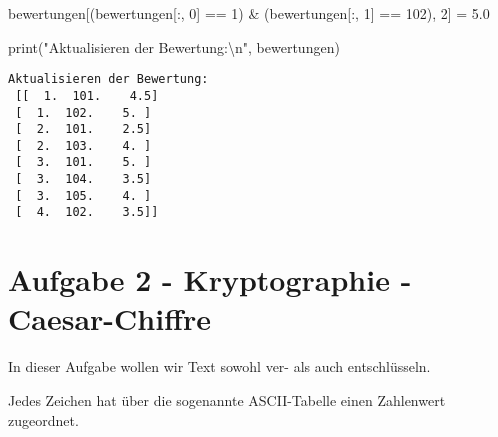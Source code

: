\documentclass[
  letterpaper,
  DIV=11,
  numbers=noendperiod]{scrreprt}
\newenvironment{Shaded}{\begin{snugshade}}{\end{snugshade}}
\newcommand{\BuiltInTok}[1]{\textcolor[rgb]{0.00,0.23,0.31}{#1}}
\newcommand{\CharTok}[1]{\textcolor[rgb]{0.13,0.47,0.30}{#1}}
\newcommand{\DecValTok}[1]{\textcolor[rgb]{0.68,0.00,0.00}{#1}}
\newcommand{\FloatTok}[1]{\textcolor[rgb]{0.68,0.00,0.00}{#1}}
\newcommand{\NormalTok}[1]{\textcolor[rgb]{0.00,0.23,0.31}{#1}}
\newcommand{\OperatorTok}[1]{\textcolor[rgb]{0.37,0.37,0.37}{#1}}
\newcommand{\StringTok}[1]{\textcolor[rgb]{0.13,0.47,0.30}{#1}}
\begin{document}
\begin{tcolorbox}
\begin{tcolorbox}
\begin{tcolorbox}[enhanced jigsaw, breakable, opacityback=0, left=2mm, coltitle=black, leftrule=.75mm, colframe=quarto-callout-caution-color-frame, opacitybacktitle=0.6, toprule=.15mm, bottomtitle=1mm, titlerule=0mm, toptitle=1mm, title={Lösung}, colbacktitle=quarto-callout-caution-color!10!white, arc=.35mm, bottomrule=.15mm, rightrule=.15mm, colback=white]

\begin{Shaded}
\begin{Highlighting}[]
\NormalTok{bewertungen[(bewertungen[:, }\DecValTok{0}\NormalTok{] }\OperatorTok{==} \DecValTok{1}\NormalTok{) }\OperatorTok{\&} 
\NormalTok{            (bewertungen[:, }\DecValTok{1}\NormalTok{] }\OperatorTok{==} \DecValTok{102}\NormalTok{), }\DecValTok{2}\NormalTok{] }\OperatorTok{=} \FloatTok{5.0}

\BuiltInTok{print}\NormalTok{(}\StringTok{"Aktualisieren der Bewertung:}\CharTok{\textbackslash{}n}\StringTok{"}\NormalTok{, bewertungen)}
\end{Highlighting}
\end{Shaded}

\begin{verbatim}
Aktualisieren der Bewertung:
 [[  1.  101.    4.5]
 [  1.  102.    5. ]
 [  2.  101.    2.5]
 [  2.  103.    4. ]
 [  3.  101.    5. ]
 [  3.  104.    3.5]
 [  3.  105.    4. ]
 [  4.  102.    3.5]]
\end{verbatim}

\end{tcolorbox}

\end{tcolorbox}

\section{Aufgabe 2 - Kryptographie -
Caesar-Chiffre}\label{aufgabe-2---kryptographie---caesar-chiffre}

In dieser Aufgabe wollen wir Text sowohl ver- als auch entschlüsseln.

Jedes Zeichen hat über die sogenannte ASCII-Tabelle einen Zahlenwert
zugeordnet.


\end{tcolorbox}
\end{document}
